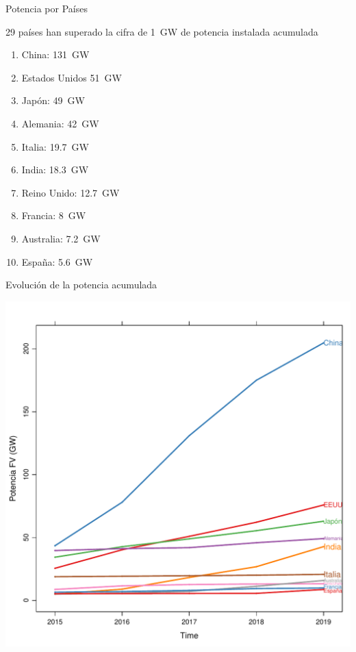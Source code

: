 \documentclass[xcolor={usenames,svgnames,dvipsnames}]{beamer}
\begin{document}
\begin{frame}[label={sec:orgf83a761}]{Potencia por Países}
\begin{block}{29 países han superado la cifra de \SI{1}{\giga\watt} de potencia instalada acumulada}
\begin{enumerate}
\item China: \SI{131}{\giga\watt}
\item Estados Unidos \SI{51}{\giga\watt}
\item Japón: \SI{49}{\giga\watt}
\item Alemania: \SI{42}{\giga\watt}
\item Italia: \SI{19.7}{\giga\watt}
\item India: \SI{18.3}{\giga\watt}
\item Reino Unido: \SI{12.7}{\giga\watt}
\item Francia: \SI{8}{\giga\watt}
\item Australia: \SI{7.2}{\giga\watt}
\item España: \SI{5.6}{\giga\watt}
\end{enumerate}
\end{block}
\end{frame}

\begin{frame}[label={sec:org74df8d6}]{Evolución de la potencia acumulada}
\begin{center}
\includegraphics[width=.9\linewidth]{../figs/PVWorld.pdf}
\end{center}
\end{frame}
\end{document}
